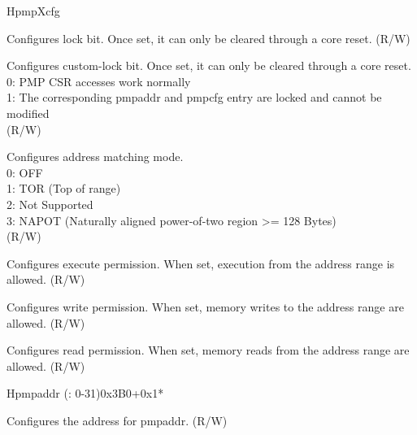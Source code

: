 \begin{register}{H}{pmpXcfg}{}
\label{regdesc:pmpXcfg}%
%
%
%
%
%
%
%
\regnewline%
\begin{regdesc}
\begin{reglist}
\label{fielddesc:pmpXcfgL}\item [L] Configures lock bit. Once set, it can only be cleared through a core reset. (R/W)
\label{fielddesc:pmpXcfgXL}\item [XL] Configures custom-lock bit. Once set, it can only be cleared through a core reset.\\
0: PMP CSR accesses work normally \\
1: The corresponding pmpaddr and pmpcfg entry are locked and cannot be modified \\
(R/W)
\label{fielddesc:pmpXcfgA}\item [A] Configures address matching mode.\\
0: OFF \\
1: TOR (Top of range) \\
2: Not Supported \\
3: NAPOT (Naturally aligned power-of-two region >= 128 Bytes)\\
(R/W)
\label{fielddesc:pmpXcfgX}\item [X] Configures execute permission. When set, execution from the address range is allowed. (R/W)
\label{fielddesc:pmpXcfgW}\item [W] Configures write permission. When set, memory writes to the address range are allowed. (R/W)
\label{fielddesc:pmpXcfgR}\item [R] Configures read permission. When set, memory reads from the address range are allowed. (R/W)
\end{reglist}
\end{regdesc}
\end{register}

\begin{register}{H}{pmpaddr (: 0-31)}{0x3B0+0x1*}\label{regdesc:pmpaddrN}
%
\regnewline%
\begin{regdesc}\begin{reglist}
\label{fielddesc:ADDR}\item [address] Configures the address for pmpaddr. (R/W)
\end{reglist}\end{regdesc}
\end{register}
